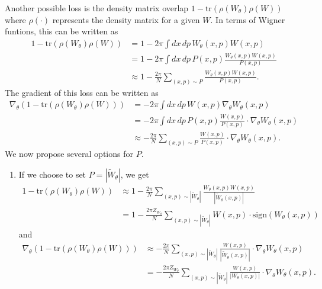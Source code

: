 \documentclass{article}
\begin{document}
Another possible loss is the density matrix overlap $1-\text{tr}(\rho(W_\theta)\rho(W))$ where $\rho(\cdot)$ represents the density matrix for a given $W$. In terms of Wigner funtions, this can be written as \begin{align*}
    1-\text{tr}(\rho(W_\theta)\rho(W)) &= 1-2\pi \int dx\, dp\, W_\theta(x,p)W(x,p)\\
    &= 1-2\pi \int dx\, dp\, P(x,p)\frac{W_\theta(x,p)W(x,p)}{P(x,p)}\\
    &\approx 1-\frac{2\pi}{N}\sum_{(x,p)\sim P}\frac{W_\theta(x,p)W(x,p)}{P(x,p)}.
\end{align*} The gradient of this loss can be written as \begin{align*}
    \nabla_\theta(1-\text{tr}(\rho(W_\theta)\rho(W))) &= -2\pi \int dx\, dp\, W(x,p) \nabla_\theta W_\theta(x,p)\\
    &= -2\pi \int dx\, dp\, P(x,p)\frac{W(x,p)}{P(x,p)}\cdot \nabla_\theta W_\theta(x,p)\\
    &\approx -\frac{2\pi}{N}\sum_{(x,p)\sim P}\frac{W(x,p)}{P(x,p)}\cdot \nabla_\theta W_\theta(x,p).
\end{align*} We now propose several options for $P$. \begin{enumerate}
    \item If we choose to set $P = |\widetilde{W}_\theta|$, we get \begin{align*}
        1-\text{tr}(\rho(W_\theta)\rho(W)) &\approx 1-\frac{2\pi}{N}\sum_{(x,p)\sim |\widetilde{W}_\theta|}\frac{W_\theta(x,p)W(x,p)}{|\widetilde{W}_\theta(x,p)|}\\
        &= 1-\frac{2\pi Z_{W_\theta}}{N}\sum_{(x,p)\sim |\widetilde{W}_\theta|} W(x,p)\cdot \text{sign}(W_\theta(x,p))
    \end{align*} and \begin{align*}
        \nabla_\theta (1-\text{tr}(\rho(W_\theta)\rho(W))) &\approx -\frac{2\pi}{N}\sum_{(x,p)\sim |\widetilde{W}_\theta|}\frac{W(x,p)}{|\widetilde{W}_\theta(x,p)|}\cdot \nabla_\theta W_\theta(x,p)\\
        &= -\frac{2\pi Z_{W_\theta}}{N}\sum_{(x,p)\sim |\widetilde{W}_\theta|}\frac{W(x,p)}{|W_\theta(x,p)|}\cdot \nabla_\theta W_\theta(x,p).
    \end{align*} 


\end{enumerate}
\end{document}

